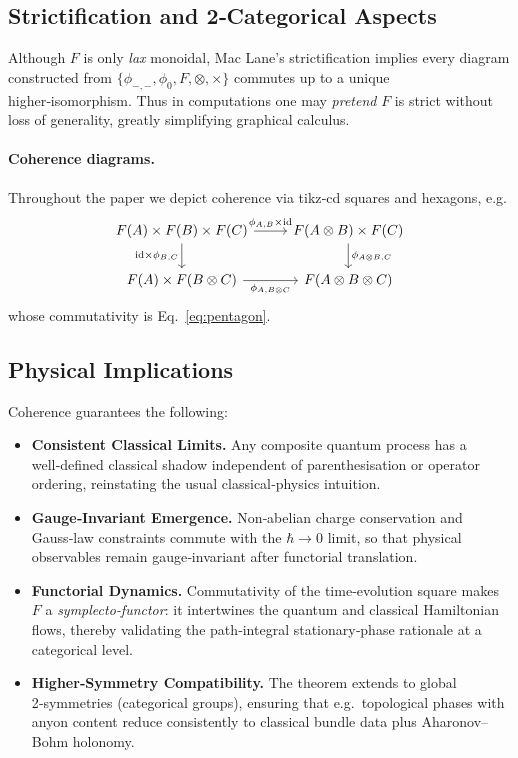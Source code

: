 \vspace{0.5cm}
\subsection{Strictification and 2‑Categorical Aspects}

Although $F$ is only \emph{lax} monoidal,
Mac Lane's strictification implies every diagram constructed from
\(
  \{\phi_{-,-},\phi_{0},F,\otimes,\times\}
\)
commutes up to a unique higher‑isomorphism.
Thus in computations one may \emph{pretend} $F$ is strict without loss
of generality, greatly simplifying graphical calculus.

\vspace{0.3cm}
\paragraph{Coherence diagrams.}
Throughout the paper we depict coherence via tikz‑cd squares and
hexagons, e.g.
\[
\begin{tikzcd}
F(A)\times F(B)\times F(C)
  \ar[r,"\phi_{A,B}\times\mathrm{id}"] \ar[d,swap,"\mathrm{id}\times\phi_{B,C}"]
&
F(A\otimes B)\times F(C)
  \ar[d,"\phi_{A\otimes B,C}"]
\\
F(A)\times F(B\otimes C)
  \ar[r,swap,"\phi_{A,B\otimes C}"]
&
F(A\otimes B\otimes C)
\end{tikzcd}
\]
whose commutativity is Eq.~\eqref{eq:pentagon}.

\vspace{0.5cm}
\subsection{Physical Implications}

Coherence guarantees the following:
\begin{itemize}
  \item \textbf{Consistent Classical Limits.}
        Any composite quantum process has a well‑defined
        classical shadow independent of parenthesisation or operator
        ordering, reinstating the usual classical‑physics intuition.
        
  \item \textbf{Gauge‑Invariant Emergence.}
        Non‑abelian charge conservation and Gauss‑law constraints
        commute with the $\hbar\to0$ limit, so that
        physical observables remain gauge‑invariant after functorial
        translation.
        
  \item \textbf{Functorial Dynamics.}
        Commutativity of the time‑evolution square makes $F$
        a \emph{symplecto‑functor}: it intertwines the quantum and
        classical Hamiltonian flows, thereby validating the path‑integral
        stationary‑phase rationale at a categorical level.
        
  \item \textbf{Higher‑Symmetry Compatibility.}
        The theorem extends to global 2‑symmetries (categorical groups),
        ensuring that e.g.\ topological phases with anyon content
        reduce consistently to classical bundle data plus Aharonov–Bohm
        holonomy.
\end{itemize}

